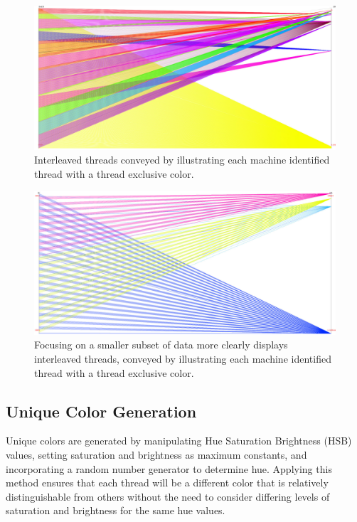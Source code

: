 \documentclass[12pt]{ucthesis}
\begin{document}
\begin{figure}[h!]
 \centering
 \includegraphics[width=\textwidth]{images/interleaved_color2.pdf}
 \caption[Identified threads rendered with a thread exclusive color.]{Interleaved threads conveyed by illustrating each machine identified thread with a thread exclusive color.}
 \label{fig:color_focus1}
\end{figure}

\begin{figure}[h!]
 \centering
 \includegraphics[width=\textwidth]{images/interleaved_color4.pdf}
 \caption[A subset of data rendered with a thread exclusive colors.]{Focusing on a smaller subset of data more clearly displays interleaved threads, conveyed by illustrating each machine identified thread with a thread exclusive color.}
 \label{fig:color_focus2}
\end{figure}

\subsection{Unique Color Generation}
Unique colors are generated by manipulating Hue Saturation Brightness (HSB) values, setting saturation and brightness as maximum constants, and incorporating a random number generator to determine hue. Applying this method ensures that each thread will be a different color that is relatively distinguishable from others without the need to consider differing levels of saturation and brightness for the same hue values. 
\end{document}
